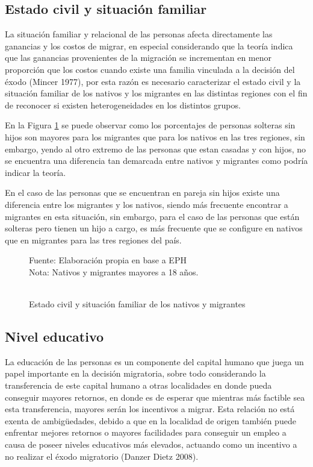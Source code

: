 \documentclass[12pt,a4paper]{article}
\begin{document}
\subsection{Estado civil y situación familiar}

La situación familiar y relacional de las personas afecta directamente las ganancias y los costos de migrar, en especial considerando que la teoría indica que las ganancias provenientes de la migración se incrementan en menor proporción que los costos cuando existe una familia vinculada a la decisión del éxodo (Mincer 1977), por esta razón es necesario caracterizar el estado civil y la situación familiar de los nativos y los migrantes en las distintas regiones con el fin de reconocer si existen heterogeneidades en los distintos grupos.

En la Figura \ref{figure:estadociv_mig} se puede observar como los porcentajes de personas solteras sin hijos son mayores para los migrantes que para los nativos en las tres regiones, sin embargo, yendo al otro extremo de las personas que estan casadas y con hijos, no se encuentra una diferencia tan demarcada entre nativos y migrantes como podría indicar la teoría.

En el caso de las personas que se encuentran en pareja sin hijos  existe una diferencia entre los migrantes y los nativos, siendo más frecuente encontrar a migrantes en esta situación, sin embargo, para el caso de las personas que están solteras pero tienen un hijo a cargo, es más frecuente que se configure en nativos que en migrantes para las tres regiones del país.

\begin{figure}[ht!]
\begin{center}
\caption{\\Estado civil y situación familiar de los nativos y migrantes}
\label{figure:estadociv_mig}
 
\end{center}
\begin{flushleft}
\begin{scriptsize}
Fuente: Elaboración propia en base a EPH\\
Nota: Nativos y migrantes mayores a 18 años.
\end{scriptsize}
\end{flushleft}
\end{figure}

\subsection{Nivel educativo}
La educación de las personas es un componente del capital humano que juega un  papel importante en la decisión migratoria, sobre todo considerando la transferencia de este capital humano a otras localidades en donde pueda conseguir mayores retornos, en donde es de esperar que mientras más factible sea esta transferencia, mayores serán los incentivos a migrar.
Esta relación no está exenta de ambigüedades, debido a que en la localidad de origen también puede enfrentar mejores retornos o mayores facilidades para conseguir un empleo a causa de poseer niveles educativos más elevados, actuando como un incentivo a no realizar el éxodo migratorio (Danzer Dietz 2008).
\end{document}
